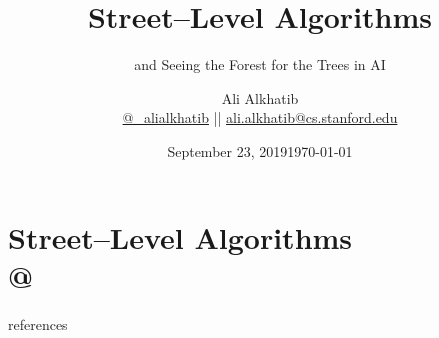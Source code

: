 \documentclass[aspectratio=169,12pt]{beamer} %
\title{Street--Level Algorithms}
\subtitle{and Seeing the Forest for the Trees in AI}
\author[Ali Alkhatib]{{Ali Alkhatib}\\
\href{http://twitter.com/_alialkhatib}{@\_alialkhatib} || \href{mailto:ali.alkhatib@cs.stanford.edu}{ali.alkhatib@cs.stanford.edu}}
\date{September 23, 2019}
\date{\today}
\newcommand{\onlyinsubfile}[1]{#1}
\newcommand{\notinsubfile}[1]{}
\begin{document}
\renewcommand{\onlyinsubfile}[1]{}
\renewcommand{\notinsubfile}[1]{#1}

\begin{frame}
\titlepage
\end{frame}


\def\stackalignment{l}
\def\stacktype{S}









\section{Street--Level Algorithms\\
{\hfill\footnotesize\citeauthor{streetLevelAlgorithms} @ }}


























% 


\begin{frame}[allowframebreaks]{references}
  \printbibliography{}
\end{frame}
\end{document}

